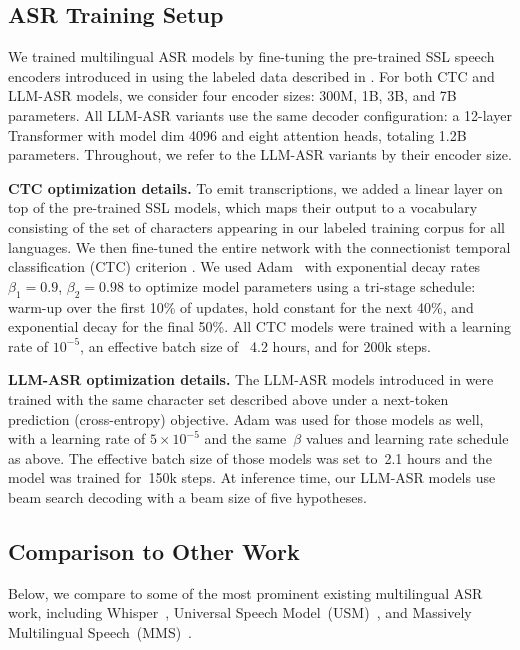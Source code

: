 \documentclass[]{fairmeta}
\begin{document}
\subsection{ASR Training Setup}
\label{sec:asr_training_setup}
We trained multilingual ASR models by fine-tuning the pre-trained SSL speech encoders introduced in  using the labeled data described in . For both CTC and LLM-ASR models, we consider four encoder sizes: 300M, 1B, 3B, and 7B parameters. All LLM-ASR variants use the same decoder configuration: a 12-layer Transformer with model dim 4096 and eight attention heads, totaling 1.2B parameters. Throughout, we refer to the LLM-ASR variants by their encoder size. 

\textbf{CTC optimization details.} To emit transcriptions, we added a linear layer on top of the pre-trained SSL models, which maps their output to a vocabulary consisting of the set of characters appearing in our labeled training corpus for all languages. We then fine-tuned the entire network with the connectionist temporal classification (CTC) criterion \citep{graves2006connectionist}. We used Adam~\citep{kingma2014adam} with exponential decay rates~$\beta_1 = 0.9$, $\beta_2 = 0.98$ to optimize model parameters using a tri-stage schedule: warm-up over the first 10\% of updates, hold constant for the next 40\%, and exponential decay for the final 50\%. All CTC models were trained with a learning rate of $10^{-5}$, an effective batch size of ~4.2 hours, and for 200k steps.

\textbf{LLM-ASR optimization details.} The LLM-ASR models introduced in  were trained with the same character set described above under a next-token prediction (cross-entropy) objective. Adam was used for those models as well, with a learning rate of $5 \times 10^{-5}$ and the same~$\beta$ values and learning rate schedule as above. The effective batch size of those models was set to~2.1 hours and the model was trained for~150k steps. At inference time, our LLM-ASR models use beam search decoding with a beam size of five hypotheses.

\subsection{Comparison to Other Work}
\label{sec:main_results}

Below, we compare \OmniASR to some of the most prominent existing multilingual ASR work, including Whisper~\citep{radford2023robust},  Universal Speech Model~(USM)~\citep{zhang2023google}, and Massively Multilingual Speech~(MMS)~\citep{pratap2024scaling}.
\end{document}
